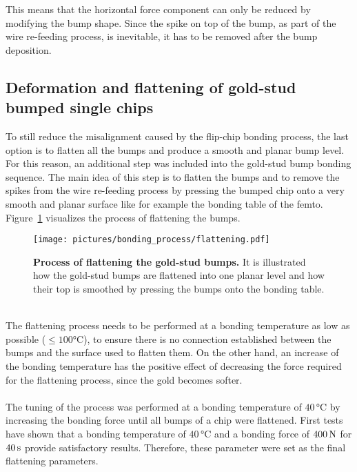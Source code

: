 This means that the horizontal force component can only be reduced by modifying the bump shape. Since the spike on top of the bump, as part of the wire re-feeding process, is inevitable, it has to be removed after the bump deposition.

\subsection{Deformation and flattening of gold-stud bumped single chips}\label{sec:flattening}
To still reduce the misalignment caused by the flip-chip bonding process, the last option is to flatten all the bumps and produce a smooth and planar bump level. For this reason, an additional step was included into the gold-stud bump bonding sequence. The main idea of this step is to flatten the bumps and to remove the spikes from the wire re-feeding process by pressing the bumped chip onto a very smooth and planar surface like for example the bonding table of the femto. Figure~\ref{fig:flattening} visualizes the process of flattening the bumps.\\
\begin{figure}
\begin{center}
\texttt{[image: pictures/bonding\_process/flattening.pdf]}
\end{center}
\caption[Process of flattening the gold-stud bumps]{\textbf{Process of flattening the gold-stud bumps.} It is illustrated how the gold-stud bumps are flattened into one planar level and how their top is smoothed by pressing the bumps onto the bonding table.}\label{fig:flattening}
\end{figure}
\\The flattening process needs to be performed at a bonding temperature as low as possible ($\leq 100\si{\degreeCelsius}$), to ensure there is no connection established between the bumps and the surface used to flatten them. On the other hand, an increase of the bonding temperature has the positive effect of decreasing the force required for the flattening process, since the gold becomes softer. \\
\\The tuning of the process was performed at a bonding temperature of $40\,\si{\degreeCelsius}$ by increasing the bonding force until all bumps of a chip were flattened. First tests have shown that a bonding temperature of $40\,\si{\degreeCelsius}$ and a bonding force of $400\,\rm{N}$ for $40\,\rm{s}$ provide satisfactory results. Therefore, these parameter were set as the final flattening parameters.

